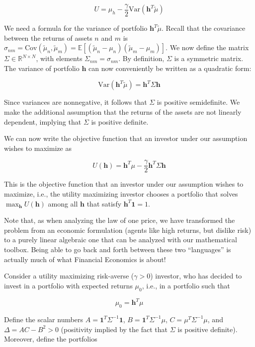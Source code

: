 \documentclass{article}
\begin{document}
\[
U = \mu_h - \frac{\gamma}{2} \text{Var}(\mathbf{h}^T \tilde{\mu})
\]

We need a formula for the variance of portfolio $\mathbf{h}^T \tilde{\mu}$. Recall that the covariance between the returns of assets $n$ and $m$ is $\sigma_{nm} = \text{Cov}(\tilde{\mu}_n, \tilde{\mu}_m) = \mathbb{E}[(\tilde{\mu}_n - \mu_n)(\tilde{\mu}_m - \mu_m)]$. We now define the matrix $\Sigma \in \mathbb{R}^{N \times N}$, with elements $\Sigma_{nm} = \sigma_{nm}$. By definition, $\Sigma$ is a symmetric matrix. The variance of portfolio $\mathbf{h}$ can now conveniently be written as a quadratic form:

\[
\text{Var}(\mathbf{h}^T \tilde{\mu}) = \mathbf{h}^T \Sigma \mathbf{h}
\]

Since variances are nonnegative, it follows that $\Sigma$ is positive semidefinite. We make the additional assumption that the returns of the assets are not linearly dependent, implying that $\Sigma$ is positive definite.

We can now write the objective function that an investor under our assumption wishes to maximize as

\[
U(\mathbf{h}) = \mathbf{h}^T \mu - \frac{\gamma}{2} \mathbf{h}^T \Sigma \mathbf{h}
\]

This is the objective function that an investor under our assumption wishes to maximize, i.e., the utility maximizing investor chooses a portfolio that solves $\max_{\mathbf{h}} U(\mathbf{h})$ among all $\mathbf{h}$ that satisfy $\mathbf{h}^T \mathbf{1} = 1$.

Note that, as when analyzing the law of one price, we have transformed the problem from an economic formulation (agents like high returns, but dislike risk) to a purely linear algebraic one that can be analyzed with our mathematical toolbox. Being able to go back and forth between these two ``languages'' is actually much of what Financial Economics is about!

Consider a utility maximizing risk-averse ($\gamma > 0$) investor, who has decided to invest in a portfolio with expected returns $\mu_0$, i.e., in a portfolio such that

\[
\mu_0 = \mathbf{h}^T \mu
\]

Define the scalar numbers $A = \mathbf{1}^T \Sigma^{-1} \mathbf{1}$, $B = \mathbf{1}^T \Sigma^{-1} \mu$, $C = \mu^T \Sigma^{-1} \mu$, and $\Delta = AC - B^2 > 0$ (positivity implied by the fact that $\Sigma$ is positive definite). Moreover, define the portfolios
\end{document}
